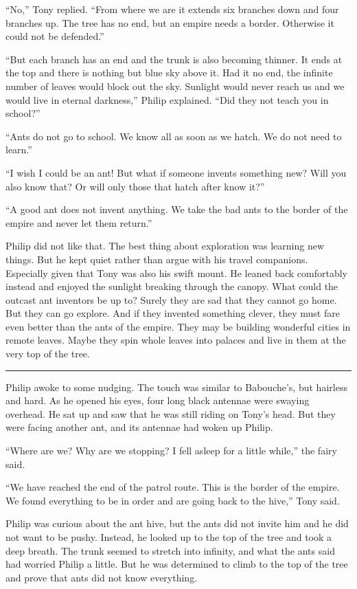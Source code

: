 \documentclass[10pt, draft]{memoir}
\renewcommand{\pfbreakdisplay}{\bigskip \ding{166} \bigskip}
\newcommand{\secbreak}{\fancybreak{\pfbreakdisplay}}
\begin{document}
``No,'' Tony replied. ``From where we are it extends six branches down and four branches up. The tree has no end, but an empire needs a border. Otherwise it could not be defended.''

``But each branch has an end and the trunk is also becoming thinner. It ends at the top and there is nothing but blue sky above it. Had it no end, the infinite number of leaves would block out the sky. Sunlight would never reach us and we would live in eternal darkness,'' Philip explained. ``Did they not teach you in school?''

``Ants do not go to school. We know all as soon as we hatch. We do not need to learn.''

``I wish I could be an ant! But what if someone invents something new? Will you also know that? Or will only those that hatch after know it?''

``A good ant does not invent anything. We take the bad ants to the border of the empire and never let them return.''

Philip did not like that. The best thing about exploration was learning new things. But he kept quiet rather than argue with his travel companions. Especially given that Tony was also his swift mount. He leaned back comfortably instead and enjoyed the sunlight breaking through the canopy. What could the outcast ant inventors be up to? Surely they are sad that they cannot go home. But they can go explore. And if they invented something clever, they must fare even better than the ants of the empire. They may be building wonderful cities in remote leaves. Maybe they spin whole leaves into palaces and live in them at the very top of the tree.

\secbreak

Philip awoke to some nudging. The touch was similar to Babouche's, but hairless and hard. As he opened his eyes, four long black antennae were swaying overhead. He sat up and saw that he was still riding on Tony's head. But they were facing another ant, and its antennae had woken up Philip.

``Where are we? Why are we stopping? I fell asleep for a little while,'' the fairy said.

``We have reached the end of the patrol route. This is the border of the empire. We found everything to be in order and are going back to the hive,'' Tony said.

Philip was curious about the ant hive, but the ants did not invite him and he did not want to be pushy. Instead, he looked up to the top of the tree and took a deep breath. The trunk seemed to stretch into infinity, and what the ants said had worried Philip a little. But he was determined to climb to the top of the tree and prove that ants did not know everything.
\end{document}
